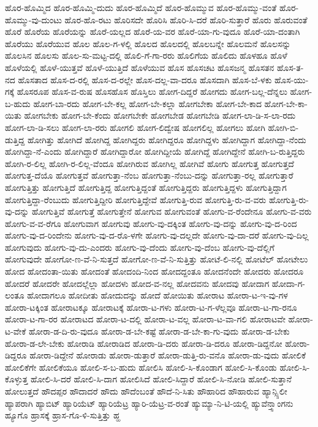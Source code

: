 {ಹೊರ-ಹೊಮ್ಮಿದ
ಹೊರ-ಹೊಮ್ಮಿ-ದುದು
ಹೊರ-ಹೊಮ್ಮಿದೆ
ಹೊರ-ಹೊಮ್ಮುವ
ಹೊರ-ಹೊಮ್ಮು-ವಂತೆ
ಹೊರ-ಹೊಮ್ಮು-ವು-ದುಂಟು
ಹೊರ-ಹೊ-ರಟು
ಹೊರಿಸದೇ
ಹೊರಿಸಿ
ಹೊರಿ-ಸಿ-ದರೆ
ಹೊರಿ-ಸುತ್ತಾರೆ
ಹೊರು
ಹೊರುವಂತೆ
ಹೊರೆ
ಹೊರೆಯ
ಹೊರೆಯನ್ನು
ಹೊರೆ-ಯಲ್ಲದ
ಹೊರೆ-ಯ-ವರ
ಹೊರೆ-ಯಾ-ಗು-ವುದೂ
ಹೊರೆ-ಯಾ-ದಂತಾಗಿ
ಹೊರೆಯು
ಹೊರೆಯುವ
ಹೊಲ
ಹೊಲ-ಗ-ಳಲ್ಲಿ
ಹೊಲದ
ಹೊಲದಲ್ಲಿ
ಹೊಲಬನ್ನೇ
ಹೊಲಮನೆ
ಹೊಲಸನ್ನು
ಹೊಲಸಿನ
ಹೊಲಸು
ಹೊಲ-ಸು-ಮಟ್ಟ-ದಲ್ಲಿ
ಹೊಲಿ-ಗೆ-ಗಾ-ರರು
ಹೊಲಿಗೆಯ
ಹೊಲಿದು
ಹೊಳಹೂ
ಹೊಳೆ
ಹೊಳೆಯಲ್ಲಿ
ಹೊಳೆ-ಯುತ್ತವೆ
ಹೊಳೆ-ಯುತ್ತಿದೆ
ಹೊಳೆಯುವ
ಹೊಸ
ಹೊಸಚಟ
ಹೊಸಜನ್ಮ
ಹೊಸತನ
ಹೊಸ-ತ-ನದ
ಹೊಸತಾದ
ಹೊಸ-ದ-ರಲ್ಲಿ
ಹೊಸ-ದ-ರಲ್ಲೇ
ಹೊಸ-ದಲ್ಲ-ವಾ-ದರೂ
ಹೊಸದಾಗಿ
ಹೊಸ-ಬೆ-ಳಕು
ಹೊಸ-ಯು-ಗಕ್ಕೆ
ಹೊಸರೂಪ
ಹೊಸ-ವ-ರುಷ
ಹೊಸಹೊಸ
ಹೊಸ್ತಿಲು
ಹೋಗ-ದಿದ್ದರೆ
ಹೋಗದು
ಹೋಗ-ಬಲ್ಲ-ದೆನ್ನಲು
ಹೋಗ-ಬ-ಹುದು
ಹೋಗ-ಬಾ-ರದು
ಹೋಗ-ಬೇ-ಕಲ್ಲ
ಹೋಗ-ಬೇ-ಕಲ್ಲಾ
ಹೋಗಬೇಕಾ
ಹೋಗ-ಬೇ-ಕಾದ
ಹೋಗ-ಬೇ-ಕಾ-ಯಿತು
ಹೋಗಬೇಕು
ಹೋಗ-ಬೇ-ಕೆಂದು
ಹೋಗಬೇಕೇ
ಹೋಗಬೇಡ
ಹೋಗಬೇಡಿ
ಹೋಗ-ಲಾ-ಡಿ-ಸ-ಲಾ-ರದು
ಹೋಗ-ಲಾ-ಡಿ-ಸಲು
ಹೋಗ-ಲಾ-ರರು
ಹೋಗಲಿ
ಹೋಗ-ಲಿದ್ವೇಷ
ಹೋಗಲಿಲ್ಲ
ಹೋಗಲು
ಹೋಗಿ
ಹೋಗಿ-ಬಿ-ಡುತ್ತಿದ್ದ
ಹೋಗಿತ್ತು
ಹೋಗಿದೆ
ಹೋಗಿದ್ದ
ಹೋಗಿದ್ದರು
ಹೋಗಿದ್ದರೂ
ಹೋಗಿದ್ದಳು
ಹೋಗಿದ್ದಾಗ
ಹೋಗಿದ್ದಾ-ನೆಂದು
ಹೋಗಿದ್ದಾ-ನೆ-ಎಂದು
ಹೋಗಿದ್ದಾರೆ
ಹೋಗಿದ್ದಾರೋ
ಹೋಗಿದ್ದೀಯೆ
ಹೋಗಿದ್ದೆ
ಹೋಗಿದ್ದೇನೆ
ಹೋಗಿ-ಬ-ರುತ್ತಿದ್ದರು
ಹೋಗಿ-ರ-ಲಿಲ್ಲ
ಹೋಗಿ-ರ-ಲಿಲ್ಲ-ವೆಂದೂ
ಹೋಗಿರುವ
ಹೋಗಿಲ್ಲ
ಹೋಗಿವೆ
ಹೋಗು
ಹೋಗುತ್ತ
ಹೋಗುತ್ತದೆ
ಹೋಗುತ್ತ-ದೆಯೊ
ಹೋಗುತ್ತವೆ
ಹೋಗುತ್ತಾ-ನೆಂಬ
ಹೋಗುತ್ತಾ-ನೆಂಬು-ದನ್ನು
ಹೋಗುತ್ತಾ-ರಲ್ಲ
ಹೋಗುತ್ತಾರೆ
ಹೋಗುತ್ತಿತ್ತು
ಹೋಗುತ್ತಿದೆ
ಹೋಗುತ್ತಿದ್ದ
ಹೋಗುತ್ತಿದ್ದಂತೆ
ಹೋಗುತ್ತಿದ್ದರು
ಹೋಗುತ್ತಿದ್ದಳು
ಹೋಗುತ್ತಿದ್ದಾಗ
ಹೋಗುತ್ತಿದ್ದಾ-ರೆಂಬುದು
ಹೋಗುತ್ತಿದ್ದೀರಿ
ಹೋಗುತ್ತಿದ್ದೇವೆ
ಹೋಗುತ್ತಿ-ರುವ
ಹೋಗುತ್ತಿ-ರು-ವ-ವರು
ಹೋಗುತ್ತಿ-ರು-ವು-ದನ್ನು
ಹೋಗುತ್ತಿವೆ
ಹೋಗುತ್ತೆ
ಹೋಗುತ್ತೇನೆ
ಹೋಗುವ
ಹೋಗುವಂತೆ
ಹೋಗು-ವ-ರೆಂದೇನೂ
ಹೋಗು-ವ-ವರು
ಹೋಗು-ವ-ವ-ರೆಗೂ
ಹೋಗುವಾಗ
ಹೋಗುವು
ಹೋಗು-ವು-ದಕ್ಕಿಂತ
ಹೋಗು-ವು-ದನ್ನು
ಹೋಗು-ವು-ದ-ರಿಂದ
ಹೋಗು-ವು-ದ-ರಿಂದೇನು
ಹೋಗು-ವು-ದ-ರೊ-ಳಗೇ
ಹೋಗು-ವು-ದಲ್ಲದೇ
ಹೋಗು-ವು-ದಾ-ದರೆ
ಹೋಗು-ವು-ದಿಲ್ಲ
ಹೋಗುವುದು
ಹೋಗು-ವು-ದು-ಎಂದರು
ಹೋಗು-ವು-ದೆಂದು
ಹೋಗು-ವು-ದೆಂಬ
ಹೋಗು-ವು-ದೆಲ್ಲಿಗೆ
ಹೋಗುವುದೇ
ಹೋಗೋ-ಣ-ವೆ-ನಿ-ಸುತ್ತದೆ
ಹೋಗೋ-ಣ-ವೆ-ನಿ-ಸುತ್ತಿತ್ತು
ಹೋಟೆ-ಲಿ-ನಲ್ಲಿ
ಹೋಟೆಲ್
ಹೋಟೇಲು
ಹೋದ
ಹೋದಂತಾ-ಯಿತು
ಹೋದಂತೆ
ಹೋದಂದಿ-ನಿಂದ
ಹೋದದ್ದಂತೂ
ಹೋದನೆಂದೇ
ಹೋದರು
ಹೋದರೂ
ಹೋದರೆ
ಹೋದರೇ
ಹೋದಲ್ಲೆಲ್ಲಾ
ಹೋದಳು
ಹೋದ-ವ-ನಲ್ಲ
ಹೋದವನು
ಹೋದವು
ಹೋದಾಗ
ಹೋದಾ-ಗ-ಲಂತೂ
ಹೋದಾಗಲೂ
ಹೋದೀತು
ಹೋದುದನ್ನು
ಹೋದೆ
ಹೋಯಿತು
ಹೋರಾಟ
ಹೋರಾ-ಟ-ಇ-ವು-ಗಳ
ಹೋರಾ-ಟಕ್ಕಿಂತ
ಹೋರಾಟಕ್ಕೂ
ಹೋರಾಟಕ್ಕೆ
ಹೋರಾ-ಟ-ಗಳು
ಹೋರಾ-ಟ-ಗ-ಳೆಲ್ಲವೂ
ಹೋರಾ-ಟ-ಗಾ-ರನೂ
ಹೋರಾ-ಟ-ಗಾ-ರರ
ಹೋರಾಟದ
ಹೋರಾ-ಟ-ದಲ್ಲಿ
ಹೋರಾ-ಟ-ವಲ್ಲ
ಹೋರಾ-ಟ-ವಾ-ಗಲಿ
ಹೋರಾಟವೇ
ಹೋರಾ-ಟ-ವೇಕೆ
ಹೋರಾ-ಡ-ದಿ-ರು-ವುದೂ
ಹೋರಾ-ಡ-ಬೇ-ಕಷ್ಟೆ
ಹೋರಾ-ಡ-ಬೇ-ಕಾ-ಗು-ವುದು
ಹೋರಾ-ಡ-ಬೇಕು
ಹೋರಾ-ಡ-ಲೇ-ಬೇಕು
ಹೋರಾಡಿ
ಹೋರಾಡಿದ
ಹೋರಾ-ಡಿ-ದರು
ಹೋರಾ-ಡಿ-ದರೂ
ಹೋರಾ-ಡಿದ್ದನೋ
ಹೋರಾ-ಡಿದ್ದರೂ
ಹೋರಾ-ಡಿದ್ದೇನೆ
ಹೋರಾಡು
ಹೋರಾ-ಡುತ್ತಾರೆ
ಹೋರಾ-ಡುತ್ತಿ-ರು-ವನೊ
ಹೋರಾ-ಡು-ವುದು
ಹೋಲಿಕೆ
ಹೋಲಿಕೆಗೇ
ಹೋಲಿಕೆಯೂ
ಹೋಲಿ-ಸ-ಬ-ಹುದು
ಹೋಲಿಸಿ
ಹೋಲಿ-ಸಿ-ಕೊಂಡಾಗ
ಹೋಲಿ-ಸಿ-ಕೊಂಡು
ಹೋಲಿ-ಸಿ-ಕೊಳ್ಳುತ್ತ
ಹೋಲಿ-ಸಿ-ದರೆ
ಹೋಲಿ-ಸಿ-ದಾಗ
ಹೋಲಿಸಿದೆ
ಹೋಲಿ-ಸಿದ್ದಾರೆ
ಹೋಲಿ-ಸಿ-ನೋಡಿ
ಹೋಲಿ-ಸುತ್ತಾನೆ
ಹೋಲುತ್ತದೆ
ಹೌದಪ್ಪರ
ಹೌದಾದರೆ
ಹೌದು
ಹೌದೆಂಬಂತೆ
ಹೌದೆ-ನಿ-ಸಿತು
ಹೌಹಾರಿದ
ಹೌಹಾರುವ
ಹ್ಯಾನ್ಸ್ಸಿಲೀ
ಹ್ಯಾಪರಾಗಿ
ಹ್ಯಾಬಿಟ್
ಹ್ಯಾರಿಯೆಟ್
ಹ್ಯಾರಿಯೆಟ್ರ
ಹ್ಯಾರಿ-ಯೆಟ್ರ-ವ-ರಂತೆ
ಹ್ಯುಮ್ಯಾ-ನಿ-ಟಿ-ಯಲ್ಲಿ
ಹ್ಯುವೆನ್ತ್ಸಾಂಗನು
ಹ್ಯೂಗೊ
ಹ್ರಾಸಕ್ಕೆ
ಹ್ರಾಸ-ಗೊ-ಳಿ-ಸುತ್ತಿತ್ತು
ಹ್ಹ
}
